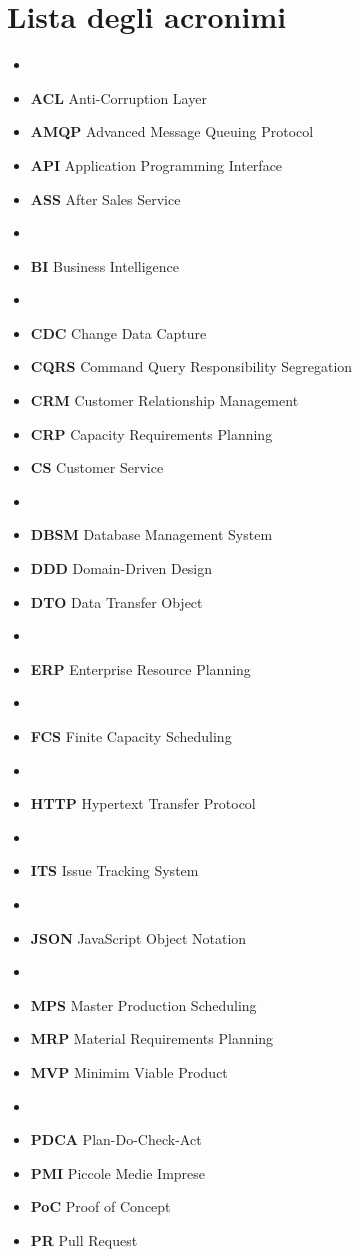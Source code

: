\newenvironment{acronymlist}
{\begin{itemize}[label={},leftmargin=*,align=left]}
{\end{itemize}}

\newcommand{\acronym}[2]{\item \textbf{#1} #2}

\newcommand{\lettergroup}[1]{\item[\textbf{#1}]}


\chapter{Lista degli acronimi}

\begin{multicols}{2} %
\begin{acronymlist}
    \lettergroup{A}
    \acronym{ACL}{Anti-Corruption Layer}
    \acronym{AMQP}{Advanced Message Queuing Protocol}
    \acronym{API}{Application Programming Interface}
    \acronym{ASS}{After Sales Service}

    \lettergroup{B}
    \acronym{BI}{Business Intelligence}

    \lettergroup{C}
    \acronym{CDC}{Change Data Capture}
    \acronym{CQRS}{Command Query Responsibility Segregation}
    \acronym{CRM}{Customer Relationship Management}
    \acronym{CRP}{Capacity Requirements Planning}
    \acronym{CS}{Customer Service}

    \lettergroup{D}
    \acronym{DBSM}{Database Management System}
    \acronym{DDD}{Domain-Driven Design}
    \acronym{DTO}{Data Transfer Object}

    \lettergroup{E}
    \acronym{ERP}{Enterprise Resource Planning}

    \lettergroup{F}
    \acronym{FCS}{Finite Capacity Scheduling}

    \lettergroup{H}
    \acronym{HTTP}{Hypertext Transfer Protocol}

    \lettergroup{I}
    \acronym{ITS}{Issue Tracking System}

    \lettergroup{J}
    \acronym{JSON}{JavaScript Object Notation}

    \lettergroup{M}
    \acronym{MPS}{Master Production Scheduling}
    \acronym{MRP}{Material Requirements Planning}
    \acronym{MVP}{Minimim Viable Product}

    \lettergroup{P}
    \acronym{PDCA}{Plan-Do-Check-Act}
    \acronym{PMI}{Piccole Medie Imprese}
    \acronym{PoC}{Proof of Concept}
    \acronym{PR}{Pull Request}


\end{acronymlist}
\end{multicols}
